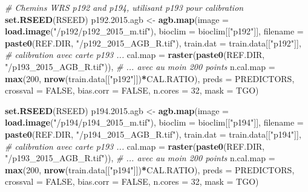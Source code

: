 \documentclass[a4paper, notitlepage, 12pt, krantz2]{krantz}
\newenvironment{Shaded}{\begin{snugshade}}{\end{snugshade}}
\newcommand{\CommentTok}[1]{\textcolor[rgb]{0.56,0.35,0.01}{\textit{#1}}}
\newcommand{\DataTypeTok}[1]{\textcolor[rgb]{0.13,0.29,0.53}{#1}}
\newcommand{\DecValTok}[1]{\textcolor[rgb]{0.00,0.00,0.81}{#1}}
\newcommand{\FloatTok}[1]{\textcolor[rgb]{0.00,0.00,0.81}{#1}}
\newcommand{\KeywordTok}[1]{\textcolor[rgb]{0.13,0.29,0.53}{\textbf{#1}}}
\newcommand{\NormalTok}[1]{#1}
\newcommand{\OperatorTok}[1]{\textcolor[rgb]{0.81,0.36,0.00}{\textbf{#1}}}
\newcommand{\OtherTok}[1]{\textcolor[rgb]{0.56,0.35,0.01}{#1}}
\newcommand{\StringTok}[1]{\textcolor[rgb]{0.31,0.60,0.02}{#1}}
\begin{document}
\begin{Shaded}
\begin{Highlighting}[]
{{{{\CommentTok{# Chemins WRS p192 and p194, utilisant p193 pour calibration}
\KeywordTok{set.RSEED}\NormalTok{(RSEED)}
\NormalTok{p192.}\FloatTok{2015.}\NormalTok{agb <-}\StringTok{ }\KeywordTok{agb.map}\NormalTok{(}\DataTypeTok{image     =} \KeywordTok{load.image}\NormalTok{(}\StringTok{"/p192/p192_2015_m.tif"}\NormalTok{), }
                         \DataTypeTok{bioclim   =}\NormalTok{ bioclim[[}\StringTok{"p192"}\NormalTok{]],}
                         \DataTypeTok{filename  =} \KeywordTok{paste0}\NormalTok{(REF.DIR, }\StringTok{"/p192_2015_AGB_R.tif"}\NormalTok{),}
                         \DataTypeTok{train.dat =}\NormalTok{ train.data[[}\StringTok{"p192"}\NormalTok{]],}
                         \CommentTok{# calibration avec carte p193 ...}
                         \DataTypeTok{cal.map   =} \KeywordTok{raster}\NormalTok{(}\KeywordTok{paste0}\NormalTok{(REF.DIR, }\StringTok{"/p193_2015_AGB_R.tif"}\NormalTok{)),}
                         \CommentTok{# ... avec au moin 200 points}
                         \DataTypeTok{n.cal.map =} \KeywordTok{max}\NormalTok{(}\DecValTok{200}\NormalTok{, }\KeywordTok{nrow}\NormalTok{(train.data[[}\StringTok{"p192"}\NormalTok{]])}\OperatorTok{*}\NormalTok{CAL.RATIO), }
                         \DataTypeTok{preds     =}\NormalTok{ PREDICTORS,}
                         \DataTypeTok{crossval  =} \OtherTok{FALSE}\NormalTok{,}
                         \DataTypeTok{bias.corr =} \OtherTok{FALSE}\NormalTok{,}
                         \DataTypeTok{n.cores   =} \DecValTok{32}\NormalTok{,}
                         \DataTypeTok{mask      =}\NormalTok{ TGO)}

\KeywordTok{set.RSEED}\NormalTok{(RSEED)}
\NormalTok{p194.}\FloatTok{2015.}\NormalTok{agb <-}\StringTok{ }\KeywordTok{agb.map}\NormalTok{(}\DataTypeTok{image     =} \KeywordTok{load.image}\NormalTok{(}\StringTok{"/p194/p194_2015_m.tif"}\NormalTok{), }
                         \DataTypeTok{bioclim   =}\NormalTok{ bioclim[[}\StringTok{"p194"}\NormalTok{]],}
                         \DataTypeTok{filename  =} \KeywordTok{paste0}\NormalTok{(REF.DIR, }\StringTok{"/p194_2015_AGB_R.tif"}\NormalTok{),}
                         \DataTypeTok{train.dat =}\NormalTok{ train.data[[}\StringTok{"p194"}\NormalTok{]],}
                         \CommentTok{# calibration avec carte p193 ...}
                         \DataTypeTok{cal.map   =} \KeywordTok{raster}\NormalTok{(}\KeywordTok{paste0}\NormalTok{(REF.DIR, }\StringTok{"/p193_2015_AGB_R.tif"}\NormalTok{)),}
                         \CommentTok{# ... avec au moin 200 points}
                         \DataTypeTok{n.cal.map =} \KeywordTok{max}\NormalTok{(}\DecValTok{200}\NormalTok{, }\KeywordTok{nrow}\NormalTok{(train.data[[}\StringTok{"p194"}\NormalTok{]])}\OperatorTok{*}\NormalTok{CAL.RATIO), }
                         \DataTypeTok{preds     =}\NormalTok{ PREDICTORS,}
                         \DataTypeTok{crossval  =} \OtherTok{FALSE}\NormalTok{,}
                         \DataTypeTok{bias.corr =} \OtherTok{FALSE}\NormalTok{,}
                         \DataTypeTok{n.cores   =} \DecValTok{32}\NormalTok{,}
                         \DataTypeTok{mask      =}\NormalTok{ TGO) }

}}}}
\end{Highlighting}
\end{Shaded}
\end{document}
